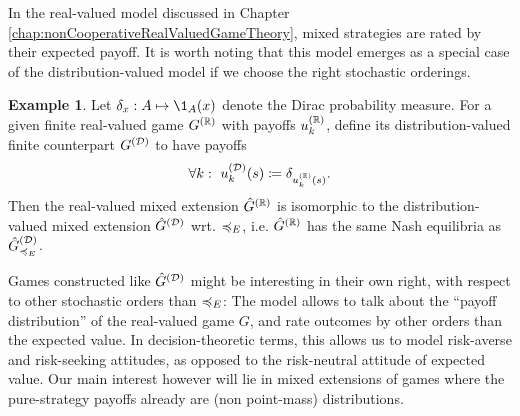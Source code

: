 \documentclass[a4paper]{scrreprt}
\theoremstyle{definition}
\newtheorem{ex}[thm]{Example} %
\begin{document}
    In the real-valued model discussed in Chapter \ref{chap:nonCooperativeRealValuedGameTheory}, mixed strategies are rated by their expected payoff. It is worth noting that this model emerges as a special case of the distribution-valued model if we choose the right stochastic orderings.
    \begin{ex}
        Let $\delta_x: A \mapsto \1_A(x)$ denote the Dirac probability measure.
        For a given finite real-valued game $G^{(\mathbb{R})}$ with payoffs $u_k^{(\mathbb{R})}$, define its distribution-valued finite counterpart $G^{(\mathcal{D})}$ to have payoffs
        \begin{gather*}
            \forall k: ~u_k^{(\mathcal{D})}(s) \coloneqq \delta_{u_k^{(\mathbb{R})}(s)}.
        \end{gather*}
        Then the real-valued mixed extension $\hat{G}^{(\mathbb{R})}$ is isomorphic to the distribution-valued mixed extension $\hat{G}^{(\mathcal{D})}$ wrt. $\preccurlyeq_E$, i.e. 
        $\hat{G}^{(\mathbb{R})}$ has the same Nash equilibria as $\hat{G}^{(\mathcal{D})}_{\preccurlyeq_E}$.
    \end{ex}
    Games constructed like $\hat{G}^{(\mathcal{D})}$ might be interesting in their own right, with respect to other stochastic orders than $\preccurlyeq_E$:
    The model allows to talk about the “payoff distribution” of the real-valued game $G$, and rate outcomes by other orders than the expected value. 
    In decision-theoretic terms, this allows us to model risk-averse and risk-seeking attitudes, as opposed to the risk-neutral attitude of expected value. Our main interest however will lie in mixed extensions of games where the pure-strategy payoffs already are (non point-mass) distributions.

    
\end{document}
